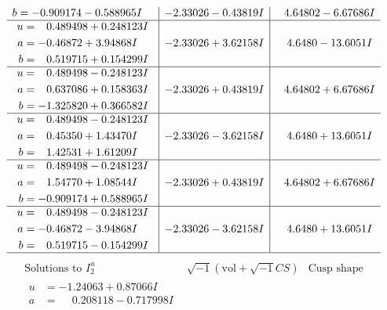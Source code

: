 \documentclass[1p]{elsarticle_modified}
\theoremstyle{definition}
\newcommand{\I}{\sqrt{-1}}
\begin{document}
$$\begin{array}{c|c|c}
\begin{aligned}
b &= -0.909174 - 0.588965 I\end{aligned}
 & -2.33026 - 0.43819 I & \phantom{-}4.64802 - 6.67686 I \\ \hline\begin{aligned}
u &= \phantom{-}0.489498 + 0.248123 I \\
a &= -0.46872 + 3.94868 I \\
b &= \phantom{-}0.519715 + 0.154299 I\end{aligned}
 & -2.33026 + 3.62158 I & \phantom{-}4.6480 - 13.6051 I \\ \hline\begin{aligned}
u &= \phantom{-}0.489498 - 0.248123 I \\
a &= \phantom{-}0.637086 + 0.158363 I \\
b &= -1.325820 + 0.366582 I\end{aligned}
 & -2.33026 + 0.43819 I & \phantom{-}4.64802 + 6.67686 I \\ \hline\begin{aligned}
u &= \phantom{-}0.489498 - 0.248123 I \\
a &= \phantom{-}0.45350 + 1.43470 I \\
b &= \phantom{-}1.42531 + 1.61209 I\end{aligned}
 & -2.33026 - 3.62158 I & \phantom{-}4.6480 + 13.6051 I \\ \hline\begin{aligned}
u &= \phantom{-}0.489498 - 0.248123 I \\
a &= \phantom{-}1.54770 + 1.08544 I \\
b &= -0.909174 + 0.588965 I\end{aligned}
 & -2.33026 + 0.43819 I & \phantom{-}4.64802 + 6.67686 I \\ \hline\begin{aligned}
u &= \phantom{-}0.489498 - 0.248123 I \\
a &= -0.46872 - 3.94868 I \\
b &= \phantom{-}0.519715 - 0.154299 I\end{aligned}
 & -2.33026 - 3.62158 I & \phantom{-}4.6480 + 13.6051 I\\
 \hline 
 \end{array}$$\newpage$$\begin{array}{c|c|c}  
\text{Solutions to }I^u_{2}& \I (\text{vol} + \sqrt{-1}CS) & \text{Cusp shape}\\
 \hline 
\begin{aligned}
u &= -1.24063 + 0.87066 I \\
a &= \phantom{-}0.208118 - 0.717998 I \\

\end{aligned}
\end{array}$$
\end{document}
